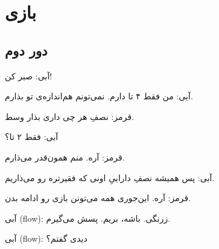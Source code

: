 \section[دورها]{بازی}\label{game}

\subsection{دور دوم}\label{round2}

آبی: صبر کن!

آبی: من فقط ۴ تا دارم.
نمی‌تونم هم‌اندازه‌ی تو بذارم.

قرمز: نصفِ هر چی داری بذار وسط.

آبی: فقط ۲ تا؟

قرمز: آره. منم همون‌قدر می‌ذارم.


آبی: پس همیشه نصفِ
داراییِ اونی که فقیرتره رو می‌ذاریم.

قرمز: آره. این‌جوری همه می‌تونن بازی رو ادامه بدن.


آبی (flow): زرنگی.
باشه، بریم.
پسش می‌گیرم.


آبی (flow): دیدی گفتم؟
